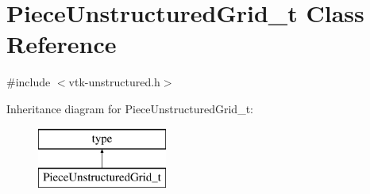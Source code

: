\hypertarget{classPieceUnstructuredGrid__t}{}\section{Piece\+Unstructured\+Grid\+\_\+t Class Reference}
\label{classPieceUnstructuredGrid__t}


{\ttfamily \#include $<$vtk-\/unstructured.\+h$>$}

Inheritance diagram for Piece\+Unstructured\+Grid\+\_\+t\+:\begin{figure}[H]
\begin{center}
\leavevmode
\includegraphics[height=2.000000cm]{classPieceUnstructuredGrid__t}
\end{center}
\end{figure}
